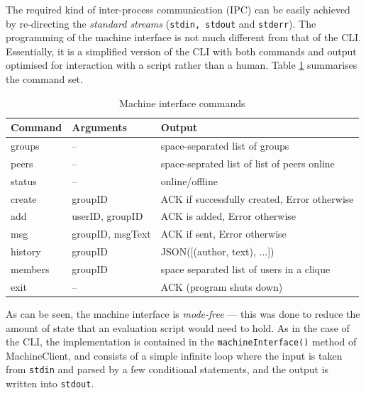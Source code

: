 \documentclass[a4paper, 12pt]{report}
\begin{document}
The required kind of inter-process communication (IPC) can be easily achieved by re-directing the \emph{standard streams} (\texttt{stdin, stdout} and \texttt{stderr}). The programming of the machine interface is not much different from that of the CLI. Essentially, it is a simplified version of the CLI with both commands and output optimised for interaction with a script rather than a human. Table \ref{tab:MachineInterface} summarises the command set.

\begin{table}[H]
\centering
\begin{tabular*}{0.95\textwidth}{l | l | l}
    Command & Arguments & Output \\
    \hline
    groups & -- & space-separated list of groups \\
    peers & -- & space-seprated list of list of peers online \\
    status & -- & online/offline \\
    create & groupID & ACK if successfully created, Error otherwise \\
    add & userID, groupID & ACK is added, Error otherwise \\
    msg & groupID, msgText & ACK if sent, Error otherwise \\
    history & groupID & JSON([(author, text), ...]) \\
    members & groupID & space separated list of users in a clique \\
    exit & -- & ACK (program shuts down)
\end{tabular*}
\caption{\label{tab:MachineInterface} Machine interface commands}
\end{table}
As can be seen, the machine interface is \emph{mode-free} --- this was done to reduce the amount of state that an evaluation script would need to hold. As in the case of the CLI, the implementation is contained in the \texttt{machineInterface()} method of MachineClient, and consists of a simple infinite loop where the input is taken from \texttt{stdin} and parsed by a few conditional statements, and the output is written into \texttt{stdout}.
\end{document}
